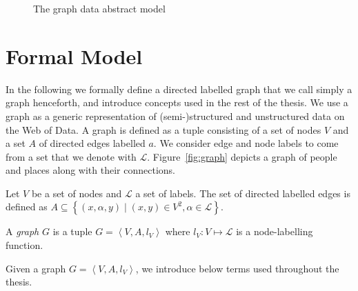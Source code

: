 \begin{figure}
	\centering
	\resizebox{.8\textwidth}{!}{
		
	}
	\caption{The graph data abstract model}
	\label{fig:gdm}
\end{figure}

\section{Formal Model}
\label{sec:gdm:formal-model}

In the following we formally define a directed labelled graph that we call simply a graph henceforth, and introduce concepts used in the rest of the thesis. We use a graph as a generic representation of (semi-)structured and unstructured data on the Web of Data. A graph is defined as a tuple consisting of a set of nodes $V$ and a set $A$ of directed edges labelled $a$. We consider edge and node labels to come from a set that we denote with $\mathcal{L}$. Figure~\ref{fig:graph} depicts a graph of people and places along with their connections.

\begin{definition}[Graph]
	Let $V$ be a set of nodes and $\mathcal{L}$ a set of labels. The set of directed labelled edges is defined as $A \subseteq \left\lbrace (x, \alpha, y) \mid (x, y) \in V^2, \alpha \in \mathcal{L} \right\rbrace$.

	A \emph{graph} $G$ is a tuple $G = \left\langle V, A, l_V \right\rangle$ where $l_V : V \mapsto \mathcal{L}$ is a node-labelling function.
\end{definition}

Given a graph $G = \left\langle V, A, l_V \right\rangle$, we introduce below terms used throughout the thesis.

